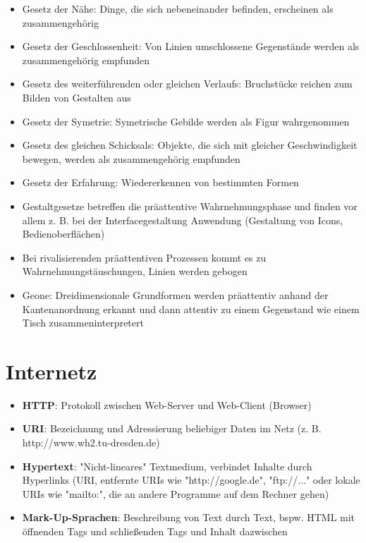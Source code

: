 \documentclass[12pt,landscape]{article}
\begin{document}
\begin{multicols}{3}
\begin{itemize}
\item Gesetz der Nähe: Dinge, die sich nebeneinander befinden, erscheinen als zusammengehörig
\item Gesetz der Geschlossenheit: Von Linien umschlossene Gegenstände werden als zusammengehörig empfunden
\item Gesetz des weiterführenden oder gleichen Verlaufs: Bruchstücke reichen zum Bilden von Gestalten aus
\item Gesetz der Symetrie: Symetrische Gebilde werden als Figur wahrgenommen
\item Gesetz des gleichen Schicksals: Objekte, die sich mit gleicher Geschwindigkeit bewegen, werden als zusammengehörig empfunden
\item Gesetz der Erfahrung: Wiedererkennen von bestimmten Formen
\item Gestaltgesetze betreffen die präattentive Wahrnehmungsphase und finden vor allem z. B. bei der Interfacegestaltung Anwendung (Gestaltung von Icons, Bedienoberflächen)
\item Bei rivalisierenden präattentiven Prozessen kommt es zu Wahrnehmungstäuschungen, Linien werden gebogen
\item Geone: Dreidimensionale Grundformen werden präattentiv anhand der Kantenanordnung erkannt und dann attentiv zu einem Gegenstand wie einem Tisch zusammeninterpretert
\end{itemize}


\section{Internetz}
\begin{itemize}
\item \textbf{HTTP}: Protokoll zwischen Web-Server und Web-Client (Browser)
\item \textbf{URI}: Bezeichnung und Adressierung beliebiger Daten im Netz (z. B. http://www.wh2.tu-dresden.de)
\item \textbf{Hypertext}: "Nicht-lineares" Textmedium, verbindet Inhalte durch Hyperlinks (URI, entfernte URIs wie "http://google.de", "ftp://..." oder lokale URIs wie "mailto:", die an andere Programme auf dem Rechner gehen)
\item \textbf{Mark-Up-Sprachen}: Beschreibung von Text durch Text, bspw. HTML mit öffnenden Tags und schließenden Tags und Inhalt dazwischen
\end{itemize}

\end{multicols}
\end{document}
